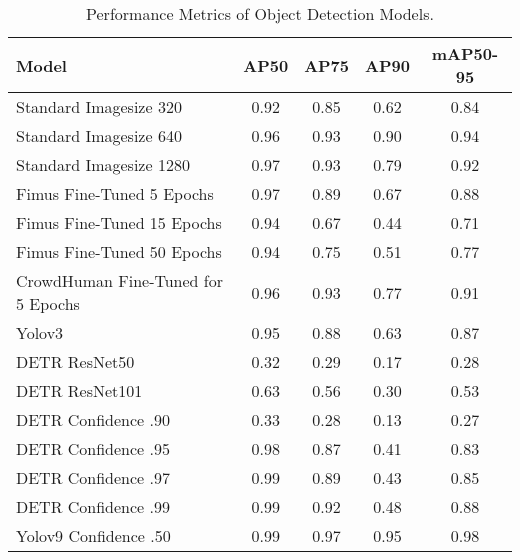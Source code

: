 \begin{table}[H]
    \centering
    \renewcommand{\arraystretch}{1.5} %
    \setlength{\tabcolsep}{1em}
    \begin{tabular}{|l|c|c|c|c|}
        \hline
        \rowcolor{gray!25}
        \textbf{Model} & \textbf{AP50} & \textbf{AP75} & \textbf{AP90} & \textbf{mAP50-95} \\ \hline
		Standard Imagesize 320 		           & 0.92 & 0.85 & 0.62 & 0.84 \\ \hline
		Standard Imagesize 640 		           & 0.96 & 0.93 & 0.90 & 0.94 \\ \hline
		Standard Imagesize 1280		           & 0.97 & 0.93 & 0.79 & 0.92 \\ \hline
		Fimus Fine-Tuned 5 Epochs              & 0.97 & 0.89 & 0.67 & 0.88 \\ \hline
		Fimus Fine-Tuned 15 Epochs             & 0.94 & 0.67 & 0.44 & 0.71 \\ \hline
		Fimus Fine-Tuned 50 Epochs             & 0.94 & 0.75 & 0.51 & 0.77 \\ \hline
		CrowdHuman Fine-Tuned for 5 Epochs	   & 0.96 & 0.93 & 0.77 & 0.91 \\ \hline
		Yolov3 							       & 0.95 & 0.88 & 0.63 & 0.87 \\ \hline
		DETR ResNet50					   	   & 0.32 & 0.29 & 0.17 & 0.28 \\ \hline	
		DETR ResNet101					       & 0.63 & 0.56 & 0.30 & 0.53 \\ \hline 
		DETR Confidence .90					   & 0.33 & 0.28 & 0.13 & 0.27 \\ \hline					   
		DETR Confidence .95					   & 0.98 & 0.87 & 0.41 & 0.83 \\ \hline
		DETR Confidence .97					   & 0.99 & 0.89 & 0.43	& 0.85 \\ \hline
		DETR Confidence .99					   & 0.99 & 0.92 & 0.48 & 0.88 \\ \hline
		Yolov9 Confidence .50				   & 0.99 & 0.97 & 0.95 & 0.98 \\ \hline
    \end{tabular}
    \caption{\centering Performance Metrics of Object Detection Models. }
    \label{tab:performance_metrics}
\end{table}
